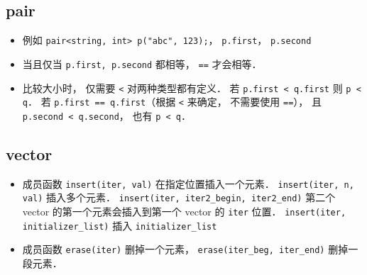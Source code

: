 
\begin{issues}
\issueDraft
\end{issues}

\subsection{pair}
\begin{itemize}
\item 例如 \verb|pair<string, int> p("abc", 123);|， \verb|p.first|， \verb|p.second|
\item 当且仅当 \verb|p.first, p.second| 都相等， \verb|==| 才会相等．
\item 比较大小时， 仅需要 \verb|<| 对两种类型都有定义． 若 \verb|p.first < q.first| 则 \verb|p < q|． 若 \verb|p.first == q.first|（根据 \verb|<| 来确定， 不需要使用 \verb|==|）， 且 \verb|p.second < q.second|， 也有 \verb|p < q|．
\end{itemize}

\subsection{vector}
\begin{itemize}
\item 成员函数 \verb|insert(iter, val)| 在指定位置插入一个元素． \verb|insert(iter, n, val)| 插入多个元素． \verb|insert(iter, iter2_begin, iter2_end)| 第二个 vector 的第一个元素会插入到第一个 vector 的 \verb|iter| 位置． \verb|insert(iter, initializer_list)| 插入 \verb|initializer_list|
\item 成员函数 \verb|erase(iter)| 删掉一个元素， \verb|erase(iter_beg, iter_end)| 删掉一段元素．
\end{itemize}

